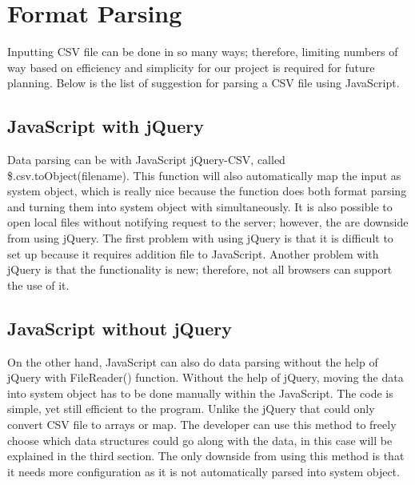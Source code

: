 \documentclass[letterpaper,10pt,titlepage, onecolumn, draftclsnofoot]{IEEEtran}
\begin{document}
\section{Format Parsing}
Inputting CSV file can be done in so many ways; therefore, limiting numbers of way based on efficiency and simplicity for our project is required for future planning. Below is the list of suggestion for parsing a CSV file using JavaScript.

\subsection{JavaScript with jQuery}
Data parsing can be with JavaScript jQuery-CSV\cite{jQuery}, called \$.csv.toObject(filename). This function will also automatically map the input as system object, which is really nice because the function does both format parsing and turning them into system object with simultaneously. It is also possible to open local files without notifying request to the server; however, the are downside from using jQuery. The first problem with using jQuery is that it is difficult to set up because it requires addition file to JavaScript. Another problem with jQuery is that the functionality is new; therefore, not all browsers can support the use of it.

\subsection{JavaScript without jQuery}
On the other hand, JavaScript can also do data parsing without the help of jQuery with FileReader() function. Without the help of jQuery, moving the data into system object has to be done manually within the JavaScript. The code is simple, yet still efficient to the program. Unlike the jQuery that could only convert CSV file to arrays or map. The developer can use this method to freely choose which data structures could go along with the data, in this case will be explained in the third section. The only downside from using this method is that it needs more configuration as it is not automatically parsed into system object.
\end{document}
